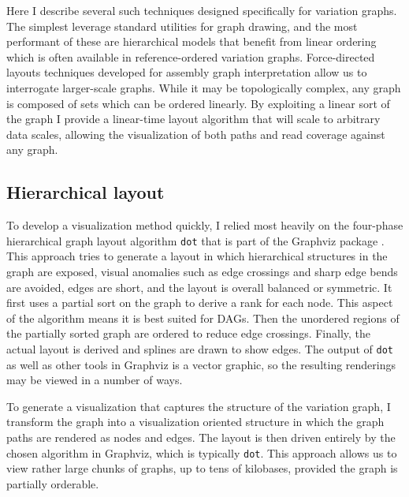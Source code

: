 \documentclass[a4paper,12pt,numbered,oneside]{Classes/PhDThesisPSnPDF}
\begin{document}
Here I describe several such techniques designed specifically for variation graphs.
The simplest leverage standard utilities for graph drawing, and the most performant of these are hierarchical models that benefit from linear ordering which is often available in reference-ordered variation graphs.
Force-directed layouts techniques developed for assembly graph interpretation allow us to interrogate larger-scale graphs.
While it may be topologically complex, any graph is composed of sets which can be ordered linearly.
By exploiting a linear sort of the graph I provide a linear-time layout algorithm that will scale to arbitrary data scales, allowing the visualization of both paths and read coverage against any graph.

\subsection{Hierarchical layout}

To develop a visualization method quickly, I relied most heavily on the four-phase hierarchical graph layout algorithm {\tt dot} \cite{gansner1993technique} that is part of the Graphviz package \cite{gansner2000open,ellson2001graphviz}.
This approach tries to generate a layout in which hierarchical structures in the graph are exposed, visual anomalies such as edge crossings and sharp edge bends are avoided, edges are short, and the layout is overall balanced or symmetric.
It first uses a partial sort on the graph to derive a rank for each node.
This aspect of the algorithm means it is best suited for DAGs.
Then the unordered regions of the partially sorted graph are ordered to reduce edge crossings.
Finally, the actual layout is derived and splines are drawn to show edges.
The output of {\tt dot} as well as other tools in Graphviz is a vector graphic, so the resulting renderings may be viewed in a number of ways.

To generate a visualization that captures the structure of the variation graph, I transform the graph into a visualization oriented structure in which the graph paths are rendered as nodes and edges.
The layout is then driven entirely by the chosen algorithm in Graphviz, which is typically {\tt dot}.
This approach allows us to view rather large chunks of graphs, up to tens of kilobases, provided the graph is partially orderable.
\end{document}
